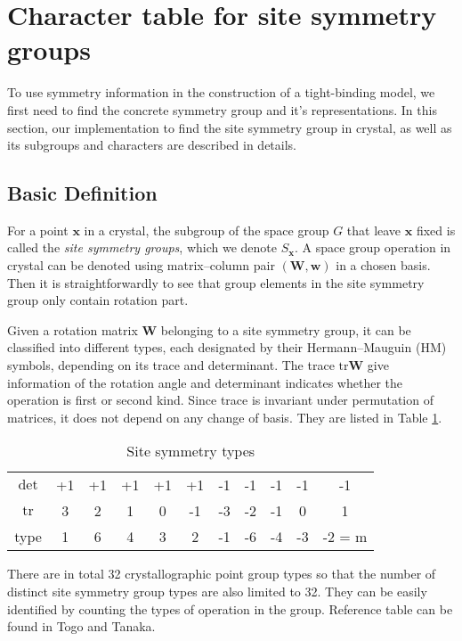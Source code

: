 \documentclass{article}
\begin{document}
\section{Character table for site symmetry groups}

To use symmetry information in the construction of a tight-binding model, we first need to 
find the concrete symmetry group and it's representations. 
In this section, our implementation to find the site symmetry group in crystal, as well as 
its subgroups and characters are described in details.

\subsection{Basic Definition}

For a point $\mathbf{x}$ in a crystal, the subgroup of the space group $G$ that leave $\mathbf{x}$
fixed is called the \emph{site symmetry groups}, which we denote $S_{\mathbf{x}}$. A space group
operation in crystal can be denoted using matrix--column pair $(\mathbf{W},\mathbf{w})$ in a chosen 
basis. Then it is straightforwardly to see that group elements in the site symmetry group only 
contain rotation part. 

Given a rotation matrix $\mathbf{W}$ belonging to a site symmetry group, it can be classified into different
types, each designated by their Hermann--Mauguin (HM) symbols, depending on its trace and determinant. 
The trace $\text{tr}\mathbf{W}$ give information of the rotation angle and determinant indicates whether 
the operation is first or second kind. 
Since trace is invariant under permutation of matrices, it does not depend on any change of basis. 
They are listed in Table \ref{T:operation_properties}. 

\begin{table}[h!]
    \centering
    \caption{Site symmetry types}
    \begin{tabular}{|c|cccccccccc|}
        \hline
        $\det$      & +1 & +1 & +1 & +1 & +1 & -1 & -1 & -1 & -1 & -1 \\ 
        $\text{tr}$ &  3 &  2 &  1 &  0 & -1 & -3 & -2 & -1 &  0 &  1 \\  
        \hline
        type        &  1 &  6 &  4 &  3 &  2 & -1 & -6 & -4 & -3 & -2 = m \\ 
        \hline
    \end{tabular}
    \label{T:operation_properties}
\end{table}

There are in total 32 crystallographic point group types so that the number of distinct site symmetry group types are
also limited to 32. They can be easily identified by counting the types of operation in the group. 
Reference table can be found in Togo and Tanaka\cite{togo_spglib_2018}.
\end{document}
